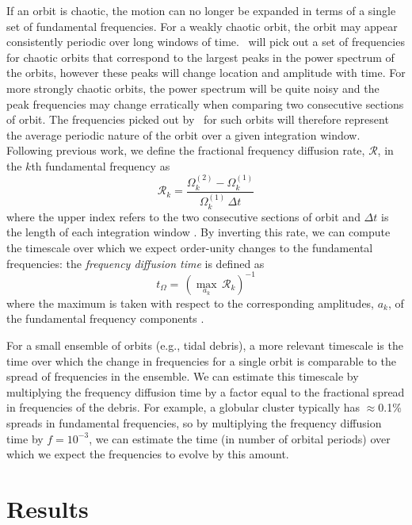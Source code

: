 If an orbit is chaotic, the motion can no longer be expanded in terms of a
single set of fundamental frequencies. For a weakly chaotic orbit, the orbit may
appear consistently periodic over long windows of time. \superfreq\ will pick
out a set of frequencies for chaotic orbits that correspond to the largest peaks
in the power spectrum of the orbits, however these peaks will change location
and amplitude with time. For more strongly chaotic orbits, the power spectrum
will be quite noisy and the peak frequencies may change erratically when
comparing two consecutive sections of orbit. The frequencies picked out by
\superfreq\ for such orbits will therefore represent the average periodic nature
of the orbit over a given integration window. Following previous work, we define
the fractional frequency diffusion rate, $\mathcal{R}$, in the $k$th fundamental
frequency as
\begin{equation}
	\mathcal{R}_k = \frac{\Omega_{k}^{(2)} - \Omega_{k}^{(1)}}{\Omega_{k}^{(1)} \, \Delta t} \label{eq:fdrate}
\end{equation}
where the upper index refers to the two consecutive sections of orbit and
$\Delta t$ is the length of each integration window \citep{laskar93, valluri98,
valluri12}. By inverting this rate, we can compute the timescale over which we
expect order-unity changes to the fundamental frequencies: the \emph{frequency
diffusion time} is defined as
\begin{equation}
	t_\Omega = \, (\max_{a_k} \, \mathcal{R}_k)^{-1} \label{eq:fdtime}
\end{equation}
where the maximum is taken with respect to the corresponding amplitudes, $a_k$,
of the fundamental frequency components \citep[see][]{valluri12}.

For a small ensemble of orbits (e.g., tidal debris), a more relevant timescale
is the time over which the change in frequencies for a single orbit is
comparable to the spread of frequencies in the ensemble. We can estimate this
timescale by multiplying the frequency diffusion time by a factor equal to the
fractional spread in frequencies of the debris. For example, a globular cluster
typically has $\approx$0.1\% spreads in fundamental frequencies, so by
multiplying the frequency diffusion time by $f = 10^{-3}$, we can estimate the
time (in number of orbital periods) over which we expect the frequencies to
evolve by this amount.

%
\section{Results}

